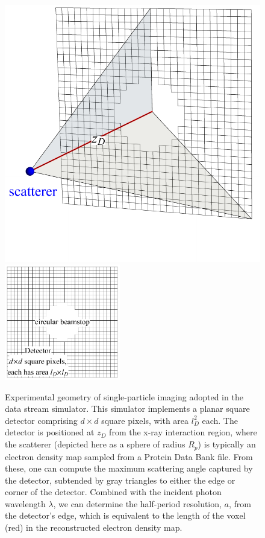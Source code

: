 \documentclass[]{iucr}              %
\begin{document}
\begin{figure}
\caption{Experimental geometry of single-particle imaging adopted in the data stream simulator. This simulator implements a planar square detector comprising $d\times d$ square pixels, with area $l_D^2$ each. The detector is positioned at $z_D$ from the x-ray interaction region, where the scatterer (depicted here as a sphere of radius $R_p$) is typically an electron density map sampled from a Protein Data Bank file. From these, one can compute the maximum scattering angle captured by the detector, subtended by gray triangles to either the edge or corner of the detector. Combined with the incident photon wavelength $\lambda$,  we can determine the half-period resolution, $a$, from the detector's edge, which is equivalent to the length of the voxel (red) in the reconstructed electron density map.}
\includegraphics[width=\textwidth]{figures/geometry1.pdf} 
\includegraphics[width=0.45\textwidth]{figures/geometry2.pdf} 

\end{figure}
\end{document}
